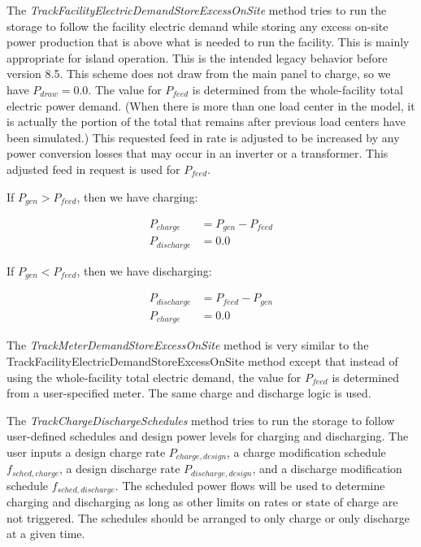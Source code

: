 The \emph{TrackFacilityElectricDemandStoreExcessOnSite} method tries to run the storage to follow the facility electric demand while storing any excess on-site power production that is above what is needed to run the facility.  This is mainly appropriate for island operation.  This is the intended legacy behavior before version 8.5.  This scheme does not draw from the main panel to charge, so we have  ${P_{draw}} = 0.0 $.  The value for ${P_{feed}}$ is determined from the whole-facility total electric power demand.  (When there is more than one load center in the model, it is actually the portion of the total that remains after previous load centers have been simulated.)  This requested feed in rate is adjusted to be increased by any power conversion losses that may occur in an inverter or a transformer.  This adjusted feed in request is used for ${P_{feed}}$. 

If ${P_{gen}} > {P_{feed}}$,  then we have charging:

\begin{equation}
  \begin{array}{rl}
    {P_{charge}} &= {P_{gen}} - {P_{feed}} \\
    {P_{discharge}} &= 0.0
  \end{array}
\end{equation}

If ${P_{gen}} < {P_{feed}}$, then we have discharging:

\begin{equation}
  \begin{array}{rl}
    {P_{discharge}} &=  {P_{feed}} - {P_{gen}} \\
    {P_{charge}} &= 0.0
  \end{array}
\end{equation}

The \emph{TrackMeterDemandStoreExcessOnSite} method is very similar to the TrackFacilityElectricDemandStoreExcessOnSite method except that instead of using the whole-facility total electric demand, the value for ${P_{feed}}$ is determined from a user-specified meter.  The same charge and discharge logic is used. 

The \emph{TrackChargeDischargeSchedules} method tries to run the storage to follow user-defined schedules and design power levels for charging and discharging.  The user inputs a design charge rate ${P_{charge,design}}$, a charge modification schedule ${f_{sched,charge}}$, a design discharge rate ${P_{discharge,design}}$, and a discharge modification schedule ${f_{sched,discharge}}$.  The scheduled power flows will be used to determine charging and discharging as long as other limits on rates or state of charge are not triggered.  The schedules should be arranged to only charge or only discharge at a given time.  

